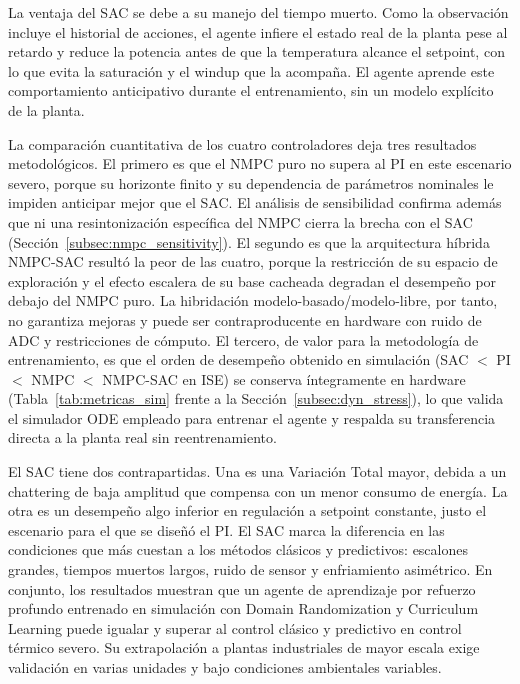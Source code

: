 \documentclass[processes,article,submit,moreauthors,pdftex]{Definitions/mdpi}
\providecommand{\dataavailability}[1]{%
  \par\medskip\noindent\textbf{Data Availability Statement:} #1}
\begin{document}
La ventaja del SAC se debe a su manejo del tiempo muerto. Como la observación
incluye el historial de acciones, el agente infiere el estado real de la
planta pese al retardo y reduce la potencia antes de que la temperatura
alcance el setpoint, con lo que evita la saturación y el windup que la
acompaña. El agente aprende este comportamiento anticipativo durante el
entrenamiento, sin un modelo explícito de la planta.

La comparación cuantitativa de los cuatro controladores deja tres resultados
metodológicos. El primero es que el NMPC puro no supera al PI en este escenario
severo, porque su horizonte finito y su dependencia de parámetros nominales le
impiden anticipar mejor que el SAC. El análisis de sensibilidad confirma además
que ni una resintonización específica del NMPC cierra la brecha con el SAC
(Sección~\ref{subsec:nmpc_sensitivity}). El segundo es que la arquitectura
híbrida NMPC-SAC resultó la peor de las cuatro, porque la restricción de su
espacio de exploración y el efecto escalera de su base cacheada degradan el
desempeño por debajo del NMPC puro. La hibridación modelo-basado/modelo-libre,
por tanto, no garantiza mejoras y puede ser contraproducente en hardware con
ruido de ADC y restricciones de cómputo. El tercero, de valor para la
metodología de entrenamiento, es que el orden de desempeño obtenido en
simulación (SAC $<$ PI $<$ NMPC $<$ NMPC-SAC en ISE) se conserva íntegramente
en hardware (Tabla~\ref{tab:metricas_sim} frente a la
Sección~\ref{subsec:dyn_stress}), lo que valida el simulador ODE empleado para
entrenar el agente y respalda su transferencia directa a la planta real sin
reentrenamiento.

El SAC tiene dos contrapartidas. Una es una Variación Total mayor, debida a un
chattering de baja amplitud que compensa con un menor consumo de energía. La
otra es un desempeño algo inferior en regulación a setpoint constante, justo
el escenario para el que se diseñó el PI. El SAC marca la diferencia en las
condiciones que más cuestan a los métodos clásicos y predictivos: escalones
grandes, tiempos muertos largos, ruido de sensor y enfriamiento asimétrico. En
conjunto, los resultados muestran que un agente de aprendizaje por refuerzo
profundo entrenado en simulación con Domain Randomization y Curriculum Learning
puede igualar y superar al control clásico y predictivo en control térmico
severo. Su extrapolación a plantas industriales de mayor escala exige
validación en varias unidades y bajo condiciones ambientales variables.


\end{document}

